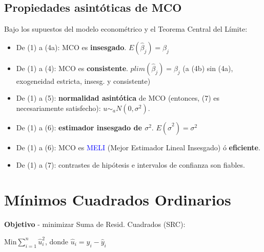 \documentclass[10pt, a4paper, landscape]{extarticle}
\begin{document}
\begin{multicols}{3}
	\subsection*{Propiedades asintóticas de MCO}
		Bajo los supuestos del modelo econométrico y el Teorema Central del Límite:
		\begin{itemize}[leftmargin=*]
			\item De (1) a (4a): MCO es \textbf{insesgado}. $E(\hat{\beta}_j) = \beta_j$
			\item De (1) a (4): MCO es \textbf{consistente}. $plim(\hat{\beta}_j) = \beta_j$ (a (4b) sin (4a), exogeneidad estricta, insesg. y consistente)
			\item De (1) a (5): \textbf{normalidad asintótica} de MCO (entonces, (7) es necesariamente satisfecho): $u \sim_a N(0,\sigma^2)$.
			\item De (1) a (6): \textbf{estimador insesgado de $\sigma^2$}. $E(\hat{\sigma}^2) = \sigma^2$
			\item De (1) a (6): MCO es \textcolor{blue}{MELI} (Mejor Estimador Lineal Insesgado) ó \textbf{eficiente}. 
			\item De (1) a (7): contrastes de hipótesis e intervalos de confianza son fiables.
		\end{itemize}

\section*{Mínimos Cuadrados Ordinarios}
	\textbf{Objetivo} - minimizar Suma de Resid. Cuadrados (SRC):
	\begin{center}
		$\text{Min} \sum_{i=1}^n \hat{u}_i^2$, donde $\hat{u}_i = y_i - \hat{y}_i$
	\end{center}

\end{multicols}
\end{document}
